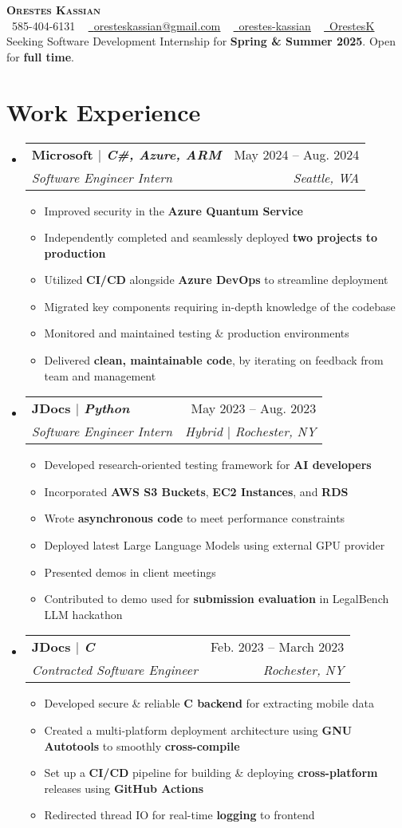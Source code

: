 \documentclass[letterpaper,11pt]{article}
\makeatletter
\newcommand{\resumeItem}[1]{
  \item\small{
    {#1 \vspace{-2pt}}
  }
}
\newcommand{\resumeSubheading}[4]{
  \vspace{-2pt}\item
    \begin{tabular*}{0.97\textwidth}[t]{l@{\extracolsep{\fill}}r}
      \textbf{#1} & #2 \\
      \textit{\small#3} & \textit{\small #4} \\
    \end{tabular*}\vspace{-7pt}
}
\newcommand{\resumeSubHeadingListStart}{\begin{itemize}[leftmargin=0.15in, label={}]}
\newcommand{\resumeSubHeadingListEnd}{\end{itemize}}
\newcommand{\resumeItemListStart}{\begin{itemize}}
\newcommand{\resumeItemListEnd}{\end{itemize}\vspace{-5pt}}
\makeatother
\begin{document}
\begin{center}
    \textbf{\fontsize{22}{22} \scshape Orestes Kassian} \\ \vspace{4pt}
    \small 
    \faPhone\ 585-404-6131 ~
    \href{mailto:oresteskassian@gmail.com}{\faEnvelope\ \uline{oresteskassian@gmail.com}} ~
    \href{https://linkedin.com/in/orestes-kassian}{\faLinkedin\ \uline{orestes-kassian}} ~
    \href{https://github.com/OrestesK}{\faGithub\ \uline{OrestesK}} \\ 
    \vspace{6pt}
    Seeking Software Development Internship for \textbf{Spring \& Summer 2025}. Open for \textbf{full time}.
\end{center}
\vspace{-20pt}

\section{Work Experience}
\resumeSubHeadingListStart
    \resumeSubheading
    {\textbf{Microsoft} $|$ \normalfont \emph{C\#, Azure, ARM}}
        { May 2024 -- Aug. 2024}
        {Software Engineer Intern}{ Seattle, WA}
    \resumeItemListStart
        \resumeItem{Improved security in the \textbf{Azure Quantum Service}}
        \resumeItem{Independently completed and seamlessly deployed \textbf{two projects to production}}
        \resumeItem{Utilized \textbf{CI/CD} alongside \textbf{Azure DevOps} to streamline deployment}
        \resumeItem{Migrated key components requiring in-depth knowledge of the codebase}
        \resumeItem{Monitored and maintained testing \& production environments}
        \resumeItem{Delivered \textbf{clean, maintainable code}, by iterating on feedback from team and management}
    \resumeItemListEnd
    \resumeSubheading
    {\textbf{JDocs} $|$ \normalfont \emph{Python}}
        { May 2023 -- Aug. 2023}
        {Software Engineer Intern}{ Hybrid $|$ Rochester, NY}
    \resumeItemListStart
    \resumeItem{Developed research-oriented testing framework for \textbf{AI developers}}
        \resumeItem{Incorporated \textbf{AWS S3 Buckets}, \textbf{EC2 Instances}, and \textbf{RDS}}
        \resumeItem{Wrote \textbf{asynchronous code} to meet performance constraints}
        \resumeItem{Deployed latest Large Language Models using external GPU provider}
        \resumeItem{Presented demos in client meetings}
        \resumeItem{Contributed to demo used for \textbf{submission evaluation} in LegalBench LLM hackathon}
    \resumeItemListEnd
    \resumeSubheading
        {\textbf{JDocs} $|$ \normalfont \emph{C}}
        { Feb. 2023 -- March 2023}
        {Contracted Software Engineer}{ Rochester, NY}
    \resumeItemListStart
    \resumeItem{Developed secure \& reliable \textbf{C backend} for extracting mobile data}
    \resumeItem{Created a multi-platform deployment architecture using \textbf{GNU Autotools} to smoothly \textbf{cross-compile}}
    \resumeItem{Set up a \textbf{CI/CD} pipeline for building \& deploying \textbf{cross-platform} releases using \textbf{GitHub Actions}}
    \resumeItem{Redirected thread IO for real-time \textbf{logging} to frontend}
    \resumeItemListEnd
\resumeSubHeadingListEnd
\end{document}
